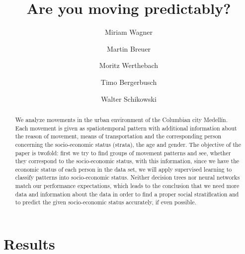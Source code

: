 \documentclass[runningheads]{llncs}
\begin{document}
	
	
	\title{Are you moving predictably?}
	\author{Miriam Wagner\and
		Martin Breuer\and
		Moritz Werthebach\and
		Timo Bergerbusch\and
		Walter Schikowski}
	\maketitle              %
	\begin{abstract}
		We analyze movements in the urban environment of the Columbian city Medellín. Each movement is given as spatiotemporal pattern with additional information about the reason of movement, means of transportation and the corresponding person concerning the socio-economic status (strata), the age and gender. 
		The objective of the paper is twofold: first we try to find groups of movement patterns and see, whether they correspond to the socio-economic status, with this information, since we have the economic status of each person in the data set, we will apply supervised learning to classify patterns into socio-economic status.
		Neither decision trees nor neural networks match our performance expectations, which leads to the conclusion that we need more data and information about the data in order to find a proper social stratification and to predict the given socio-economic status accurately, if even possible.
		
	\end{abstract}
	
	
	

%	
	
	\section{Results}
		
\end{document}
